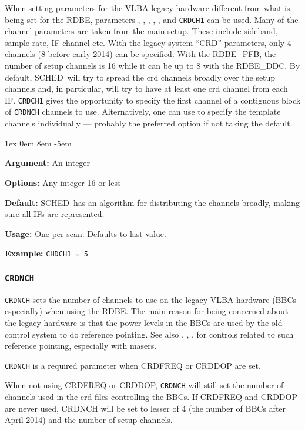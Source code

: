 \documentclass{report}
\newcommand{\schedb}{{\sc SCHED~}}
\newcommand{\rcwbox}[5]{
  \begin{list}{}{\parsep 1ex  \itemsep 0em
                 \leftmargin 8em  \itemindent -5em }
    \item {\bf Argument:} #1
    \item {\bf Options:}  #2
    \item {\bf Default:}  #3
    \item {\bf Usage:}    #4
    \item {\bf Example:}  #5
  \end{list}
}
\begin{document}
When setting parameters for the VLBA legacy hardware different from
what is being set for the RDBE, parameters 
, 
,
, 
, 
, and 
{\tt CRDCH1} can be used.  Many of the channel parameters are taken
from the main setup.  These include sideband, sample rate, IF channel
etc.  With the legacy system ``CRD'' parameters, only 4 channels (8
before early 2014) can be specified.  With the RDBE\_PFB, the number
of setup channels is 16 while it can be up to 8 with the RDBE\_DDC.
By default, \schedb will try to spread the crd channels broadly over
the setup channels and, in particular, will try to have at least one
crd channel from each IF.  {\tt CRDCH1} gives the opportunity to
specify the first channel of a contiguous block of {\tt CRDNCH}
channels to use.  Alternatively, one can use  to specify the template channels individually
--- probably the preferred option if not taking the default.

\rcwbox
{An integer}
{Any integer 16 or less}
{\schedb has an algorithm for distributing the channels broadly, 
making sure all IFs are represented.}
{One per scan.  Defaults to last value.}
{{\tt CHDCH1 = 5}}

\subsubsection{\label{MP:CRDNCH}{\tt CRDNCH}}

{\tt CRDNCH} sets the number of channels to use on the legacy VLBA
hardware (BBCs especially) when using the RDBE.  The main reason for
being concerned about the legacy hardware is that the power levels in
the BBCs are used by the old control system to do reference pointing.
See also , , ,  for controls related to such reference pointing,
especially with masers.

{\tt CRDNCH} is a required parameter when CRDFREQ or CRDDOP are set.

When not using CRDFREQ or CRDDOP, {\tt CRDNCH} will still set the number 
of channels used in the crd files controlling the BBCs.  If CRDFREQ and 
CRDDOP are never used, CRDNCH will be set to lesser of 4 (the number of
BBCs after April 2014) and the number of setup channels.
\end{document}
